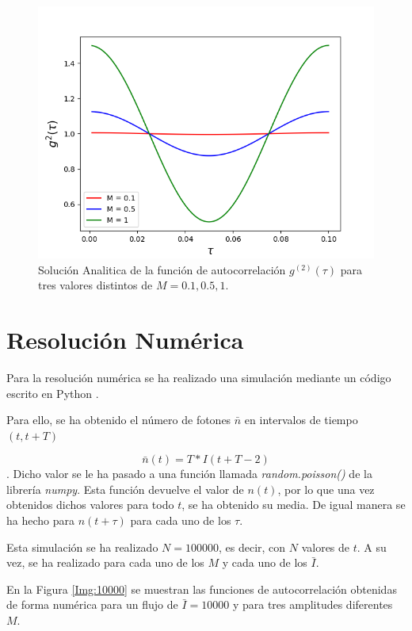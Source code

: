 \documentclass[twoside]{article}
\begin{document}
\begin{multicols}{2}
				\begin{figure}[H]
					\centering
					\includegraphics[scale=0.45]{../TheoInt.png}
					\caption{\label{Img:Anal}Solución Analitica de la función de autocorrelación $g^{(2)}(\tau)$ para tres valores distintos de $M = {0.1, 0.5, 1}$.}
				\end{figure}

		\section{Resolución Numérica}

			Para la resolución numérica se ha realizado una simulación mediante un código escrito en Python \cite{Resonador}. 

			Para ello, se ha obtenido el número de fotones $\bar{n}$ en intervalos de tiempo $(t,t+T)$

				\begin{equation}
					\bar{n}(t) = T*I(t+T-2)
					\label{eq:poiss}
				\end{equation}
			. Dicho valor se le ha pasado a una función llamada \textit{random.poisson()} de la librería \textit{numpy}. Esta función devuelve el valor de $n(t)$, por lo que una vez obtenidos dichos valores para todo $t$, se ha obtenido su media. De igual manera se ha hecho para $n(t+\tau)$ para cada uno de los $\tau$.

			Esta simulación se ha realizado $N = 100000$, es decir, con $N$ valores de $t$. A su vez, se ha realizado para cada uno de los $M$ y cada uno de los $\bar{I}$.

			En la Figura \ref{Img:10000} se muestran las funciones de autocorrelación obtenidas de forma numérica para un flujo de $\bar{I} = 10000$ y para tres amplitudes diferentes $M$.


\end{multicols}
\end{document}

